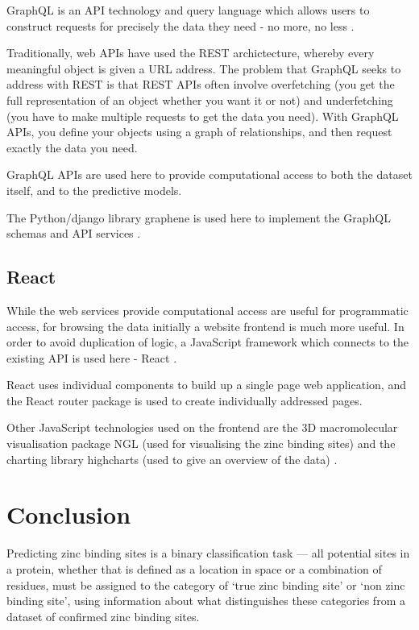 GraphQL is an API technology and query language which allows users to construct requests for precisely the data they need - no more, no less \cite{graphql}.

Traditionally, web APIs have used the REST archictecture, whereby every meaningful object is given a URL address. The problem that GraphQL seeks to address with REST is that REST APIs often involve overfetching (you get the full representation of an object whether you want it or not) and underfetching (you have to make multiple requests to get the data you need). With GraphQL APIs, you define your objects using a graph of relationships, and then request exactly the data you need.

GraphQL APIs are used here to provide computational access to both the dataset itself, and to the predictive models.

The Python/django library graphene is used here to implement the GraphQL schemas and API services \cite{graphene}.

\subsection{React}

While the web services provide computational access are useful for programmatic access, for browsing the data initially a website frontend is much more useful. In order to avoid duplication of logic, a JavaScript framework which connects to the existing API is used here - React \cite{react}.

React uses individual components to build up a single page web application, and the React router package is used to create individually addressed pages.

Other JavaScript technologies used on the frontend are the 3D macromolecular visualisation package NGL (used for visualising the zinc binding sites) \cite{rose2015ngl} and the charting library highcharts (used to give an overview of the data) \cite{highcharts}.

\section{Conclusion}

Predicting zinc binding sites is a binary classification task --- all potential sites in a protein, whether that is defined as a location in space or a combination of residues, must be assigned to the category of `true zinc binding site' or `non zinc binding site', using information about what distinguishes these categories from a dataset of confirmed zinc binding sites.

